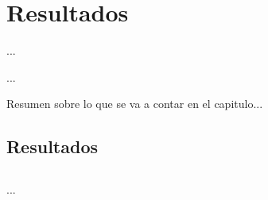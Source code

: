 
%
%

\chapter{Resultados}

\begin{FraseCelebre}
\begin{Frase}
...
\end{Frase}
\begin{Fuente}
...
\end{Fuente}
\end{FraseCelebre}

\begin{resumen}
Resumen sobre lo que se va a contar en el capitulo...
\end{resumen}


\section{Resultados}
\label{cap31:sec:resultados}

\section*{\ProximoCapitulo}
\TocProximoCapitulo

...







